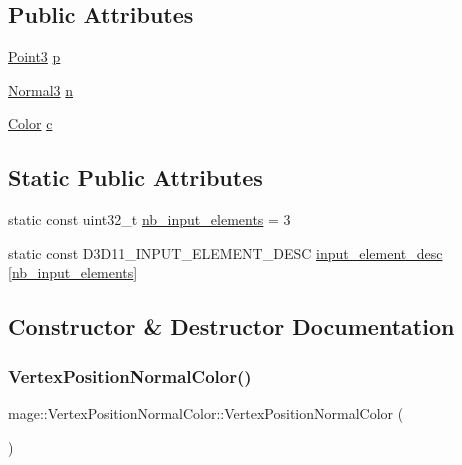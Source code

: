 \subsection*{Public Attributes}
\begin{DoxyCompactItemize}
\item 
\hyperlink{structmage_1_1_point3}{Point3} \hyperlink{structmage_1_1_vertex_position_normal_color_a6847c367ca68fb8d8e349c8441ae63dd}{p}
\item 
\hyperlink{structmage_1_1_normal3}{Normal3} \hyperlink{structmage_1_1_vertex_position_normal_color_a771c7e71e8b6441b73f513f511507650}{n}
\item 
\hyperlink{structmage_1_1_color}{Color} \hyperlink{structmage_1_1_vertex_position_normal_color_a0d170b26a78b179330ae282ce97a036b}{c}
\end{DoxyCompactItemize}
\subsection*{Static Public Attributes}
\begin{DoxyCompactItemize}
\item 
static const uint32\+\_\+t \hyperlink{structmage_1_1_vertex_position_normal_color_aa879572455aa5921256ddd734b8600fc}{nb\+\_\+input\+\_\+elements} = 3
\item 
static const D3\+D11\+\_\+\+I\+N\+P\+U\+T\+\_\+\+E\+L\+E\+M\+E\+N\+T\+\_\+\+D\+E\+SC \hyperlink{structmage_1_1_vertex_position_normal_color_a6ed09568c20b3a839c875dd173280f48}{input\+\_\+element\+\_\+desc} \mbox{[}\hyperlink{structmage_1_1_vertex_position_normal_color_aa879572455aa5921256ddd734b8600fc}{nb\+\_\+input\+\_\+elements}\mbox{]}
\end{DoxyCompactItemize}


\subsection{Constructor \& Destructor Documentation}
\hypertarget{structmage_1_1_vertex_position_normal_color_a8c8eff8f2fc3520bec482e89e2b32119}{}\label{structmage_1_1_vertex_position_normal_color_a8c8eff8f2fc3520bec482e89e2b32119} 
\subsubsection{\texorpdfstring{Vertex\+Position\+Normal\+Color()}{VertexPositionNormalColor()}\hspace{0.1cm}{\footnotesize\ttfamily [1/4]}}
{\footnotesize\ttfamily mage\+::\+Vertex\+Position\+Normal\+Color\+::\+Vertex\+Position\+Normal\+Color (\begin{DoxyParamCaption}{ }\end{DoxyParamCaption})\hspace{0.3cm}{\ttfamily [default]}}

